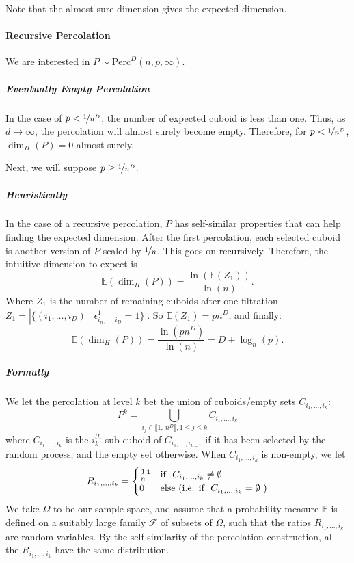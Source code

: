 Note that the almost sure dimension gives the expected dimension.

\paragraph{Recursive Percolation}
We are interested in $P \sim \text{Perc}^D(n,p,\infty)$.

\subparagraph{Eventually Empty Percolation}
In the case of $p < \nicefrac{1}{n^D}$, the number of expected cuboid is less than one.
Thus, as $d \to \infty$, the percolation will almost surely become empty.
Therefore, for $p < \nicefrac{1}{n^D}$, $\dim_H(P) = 0$ almost surely. 

Next, we will suppose $p \geq \nicefrac{1}{n^D}$.

\subparagraph{Heuristically}
In the case of a recursive percolation, $P$ has self-similar properties that can help finding the expected dimension.
After the first percolation, each selected cuboid is another version of $P$ scaled by $\nicefrac{1}{n}$.
This goes on recursively.
Therefore, the intuitive dimension to expect is 
$$\mathbb{E}(\dim_H(P)) = \frac{\ln(\mathbb{E}(Z_1))}{\ln(n)}.$$
Where $Z_1$ is the number of remaining cuboids after one filtration $Z_1 = \left| \{ (i_1,\dots,i_D) \mid \epsilon_{i_n,\dots,i_D}^1 = 1 \} \right|$.
So $\mathbb{E}(Z_1) = p n^D$, and finally:
$$\mathbb{E}(\dim_H(P)) = \frac{\ln(p n^D)}{\ln(n)} = D + \log_n(p).$$

\subparagraph{Formally}
We let the percolation at level $k$ bet the union of cuboids/empty sets $C_{i_1,\dots,i_k}$:
$$
P^k = \bigcup_{i_j \in \llbracket 1, \ n^D \rrbracket, 1 \leq j \leq k} C_{i_1,\dots,i_k}
$$
where $C_{i_1,\dots,i_k}$ is the $i_k^{th}$ sub-cuboid of $C_{i_1,\dots,i_{k-1}}$ if it has been selected by the random process, and the empty set otherwise.
When $C_{i_1,\dots,i_k}$ is non-empty, we let 
\begin{equation*}
	R_{i_1,\dots,i_k} =
	\begin{cases}
		\frac{1}{n} \footnotemark & \text{if } \  C_{i_1,\dots,i_k} \neq \emptyset \\
		0 & \text{else (i.e. if } \  C_{i_1,\dots,i_k} = \emptyset \text{ )}
	\end{cases}
\end{equation*}
We take $\Omega$ to be our sample space, and assume that a probability measure $\mathbb{P}$ is defined on a suitably large family $\mathcal{F}$ of subsets of $\Omega$, such that the ratios $R_{i_1,\dots,i_k}$ are random variables.
By the self-similarity of the percolation construction, all the $R_{i_1,\dots,i_k}$ have the same distribution.

